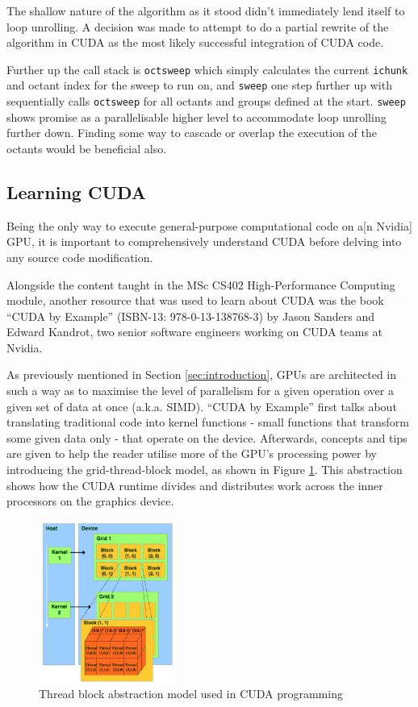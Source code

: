 \documentclass[conference]{IEEEtran}
\begin{document}
The shallow nature of the algorithm as it stood didn't immediately lend itself to loop unrolling. A decision was made to attempt to do a partial rewrite of the algorithm in CUDA as the most likely successful integration of CUDA code.

Further up the call stack is \texttt{octsweep} which simply calculates the current \texttt{ichunk} and octant index for the sweep to run on, and \texttt{sweep} one step further up with sequentially calls \texttt{octsweep} for all octants and groups defined at the start. \texttt{sweep} shows promise as a parallelisable higher level to accommodate loop unrolling further down. Finding some way to cascade or overlap the execution of the octants would be beneficial also.

\subsection{Learning CUDA}
\label{subsec:inv_learningcuda}

Being the only way to execute general-purpose computational code on a[n Nvidia] GPU, it is important to comprehensively understand CUDA before delving into any source code modification.

Alongside the content taught in the MSc CS402 High-Performance Computing module, another resource that was used to learn about CUDA was the book ``CUDA by Example'' (ISBN-13: 978-0-13-138768-3) by Jason Sanders and Edward Kandrot\cite{sanders2010cuda}, two senior software engineers working on CUDA teams at Nvidia.

As previously mentioned in Section \ref{sec:introduction}, GPUs are architected in such a way as to maximise the level of parallelism for a given operation over a given set of data at once (a.k.a. SIMD). ``CUDA by Example'' first talks about translating traditional code into kernel functions - small functions that transform some given data only - that operate on the device. Afterwards, concepts and tips are given to help the reader utilise more of the GPU's processing power by introducing the grid-thread-block model, as shown in Figure \ref{fig:gridblockthread}. This abstraction shows how the CUDA runtime divides and distributes work across the inner processors on the graphics device.

\begin{figure}[!h]
    \centering
    \includegraphics[width=0.4\textwidth]{images/grid_block_thread.png}
    \caption{Thread block abstraction model used in CUDA programming}
    \label{fig:gridblockthread}
\end{figure}
\end{document}
